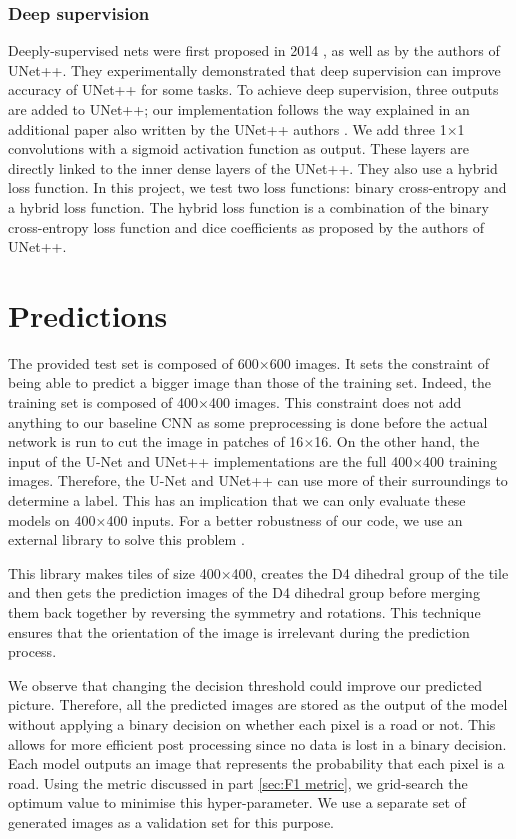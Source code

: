 \documentclass[10pt,conference,a4paper]{IEEEtran}
\begin{document}
\subsubsection{Deep supervision}
\label{sec:deep supervision}

Deeply-supervised nets were first proposed in 2014 \cite{lee2014deeplysupervised}, as well as by the authors of UNet++.
They experimentally demonstrated that deep supervision can improve accuracy of UNet++ for some tasks.
To achieve deep supervision, three outputs are added to UNet++; our implementation follows the way explained in an additional paper also written by the UNet++ authors \cite{zhou2019unet}.
We add three 1$\times$1 convolutions with a sigmoid activation function as output.
These layers are directly linked to the inner dense layers of the UNet++. 
They also use a hybrid loss function.
In this project, we test two loss functions: binary cross-entropy and a hybrid loss function.
The hybrid loss function is a combination of the binary cross-entropy loss function and dice coefficients as proposed by the authors of UNet++.


\section{Predictions} \label{prediction}

The provided test set is composed of 600$\times$600 images.
It sets the constraint of being able to predict a bigger image than those of the training set.
Indeed, the training set is composed of 400$\times$400 images. 
This constraint does not add anything to our baseline CNN as some preprocessing is done before the actual network is run to cut the image in patches of 16$\times$16.
On the other hand, the input of the U-Net and UNet++ implementations are the full 400$\times$400 training images.
Therefore, the U-Net and UNet++ can use more of their surroundings to determine a label.
This has an implication that we can only evaluate these models on 400$\times$400 inputs.
For a better robustness of our code, we use an external library to solve this problem \cite{blend}.

This library makes tiles of size 400$\times$400, creates the D4 dihedral group of the tile and then gets the prediction images of the D4 dihedral group before merging them back together by reversing the symmetry and rotations.
This technique ensures that the orientation of the image is irrelevant during the prediction process.

We observe that changing the decision threshold could improve our predicted picture.
Therefore, all the predicted images are stored as the output of the model without applying a binary decision on whether each pixel is a road or not. 
This allows for more efficient post processing since no data is lost in a binary decision.
Each model outputs an image that represents the probability that each pixel is a road. 
Using the metric discussed in part \ref{sec:F1 metric}, we grid-search the optimum value to minimise this hyper-parameter.
We use a separate set of generated images as a validation set for this purpose.
\end{document}
